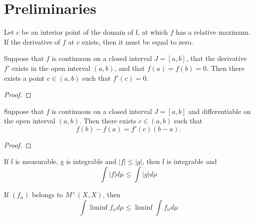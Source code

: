 \section{Preliminaries} %



\begin{theorem}
    Let $c$ be an interior point of the domain of f, at which $f$ has a relative 
    maximum. If the derivative of $f$ at $c$ exists, then it must be equal to zero.
    
\end{theorem}
\begin{theorem}
    Suppose that $f$ is continuous on a closed interval $J = [a,b]$, that the 
    derivative $f'$ exists in the open interval $(a,b)$, and that 
    $f(a) = f(b) = 0$. Then there exists a point $c \in (a,b)$ such that 
    $f'(c) = 0$.
\end{theorem}
\begin{proof}

\end{proof}
\begin{theorem}
	Suppose that $f$ is continuous on a closed interval $J = [a,b]$ and 
	differentiable on the open interval $(a,b)$. Then there exists $c \in (a,b)$ 
	such that 
	$$
	    f(b) - f(a) = f'(c)(b - a).
	$$
\end{theorem}
\begin{proof}

\end{proof}
\begin{corollary}
    If f is measurable, g is integrable and $|f| \leq |g|$, then f is integrable
    and
    $$
        \int |f| d\mu \leq  \int |g| d\mu
    $$
\end{corollary}
\begin{lemma}
    If $(f_n)$ belongs to $M^{+}(X,X)$, then
    $$
        \int \liminf f_n d\mu \leq \liminf \int f_n d\mu
    $$
\end{lemma}
